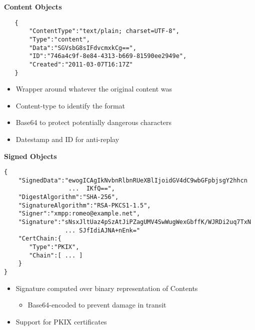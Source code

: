 \documentclass[helvetica]{seminar}
\newcommand{\heading}[1]{%
  \begin{center} 
    \large\bf 
    #1 
  \end{center} 
  \vspace{.4 in}}
\begin{document}
\begin{slide}
\heading{Content Objects}

\vspace{-.2in}

{\small
\begin{verbatim}
   {
       "ContentType":"text/plain; charset=UTF-8",
       "Type":"content",
       "Data":"SGVsbG8sIFdvcmxkCg==",
       "ID":"746a4c9f-8e84-4313-b669-81590ee2949e",
       "Created":"2011-03-07T16:17Z"
   }
\end{verbatim}
}

\vspace{.1in}
\begin{itemize}
\item Wrapper around whatever the original content was
\item Content-type to identify the format
\item Base64 to protect potentially dangerous characters
\item Datestamp and ID for anti-replay
\end{itemize}
\end{slide}



\begin{slide}
\heading{Signed Objects}

\vspace{-.4in}

{\footnotesize
\begin{verbatim}
{
    "SignedData":"ewogICAgIkNvbnRlbnRUeXBlIjoidGV4dC9wbGFpbjsgY2hhcn
                  ...  IKfQ==",
    "DigestAlgorithm":"SHA-256",
    "SignatureAlgorithm":"RSA-PKCS1-1.5",
    "Signer":"xmpp:romeo@example.net",
    "Signature":"sNsxJltUaz4pSzAtJiPZagUMV4SwWugWexGbffK/WJRDi2uq7TxN
                 ... SJfIdiAJNA+nEnk="
    "CertChain:{
       "Type":"PKIX",
       "Chain":[ ... ]
    }
}
\end{verbatim}
}

\vspace{-.1in}
\begin{itemize}
\item Signature computed over binary representation of Contents
  \begin{itemize}
  \item Base64-encoded to prevent damage in transit
  \end{itemize}
\item Support for PKIX certificates
\end{itemize}
\vspace{.2in}
\end{slide}
\end{document}
